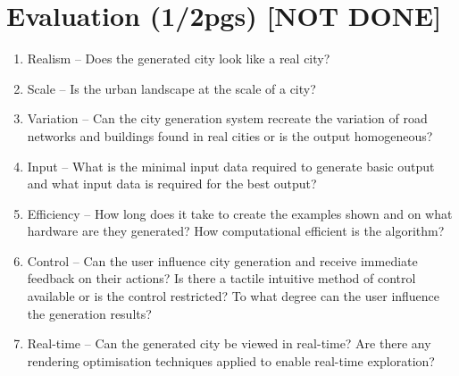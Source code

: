 
% 
% 

\section{Evaluation (1/2pgs)  [NOT DONE]}
\label{sec:evaluation}

\cite{Kelly}
\begin{enumerate}
	\item Realism – Does the generated city look like a real city?
	\item Scale – Is the urban landscape at the scale of a city?
	\item Variation – Can the city generation system recreate the variation of road networks and buildings found in real cities or is the output homogeneous?
	\item Input – What is the minimal input data required to generate basic output and what input data is required for the best output?
	\item Efficiency – How long does it take to create the examples shown and on what hardware are they generated? How computational efficient is the algorithm?
	\item Control – Can the user influence city generation and receive immediate feedback on their actions? Is there a tactile intuitive method of control available or is the control restricted? To what degree can the user influence the generation results?
	\item Real-time – Can the generated city be viewed in real-time? Are there any rendering optimisation techniques applied to enable real-time exploration?
\end{enumerate}
